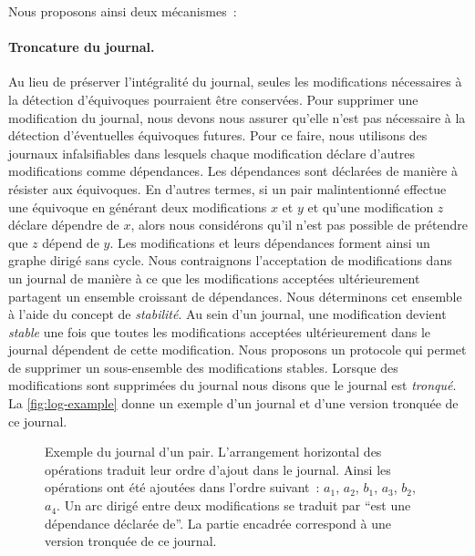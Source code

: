 Nous proposons ainsi deux mécanismes~:

\paragraph{Troncature du journal.} Au lieu de préserver l'intégralité du journal, seules les modifications nécessaires à la détection d'équivoques pourraient être conservées.
Pour supprimer une modification du journal, nous devons nous assurer qu'elle n'est pas nécessaire à la détection d'éventuelles équivoques futures.
Pour ce faire, nous utilisons des journaux infalsifiables dans lesquels chaque modification déclare d'autres modifications comme dépendances.
Les dépendances sont déclarées de manière à résister aux équivoques.
En d'autres termes, si un pair malintentionné effectue une équivoque en générant deux modifications $x$ et $y$ et qu'une modification $z$ déclare dépendre de $x$, alors nous considérons qu'il n'est pas possible de prétendre que $z$ dépend de $y$.
Les modifications et leurs dépendances forment ainsi un graphe dirigé sans cycle.
Nous contraignons l'acceptation de modifications dans un journal de manière à ce que les modifications acceptées ultérieurement partagent un ensemble croissant de dépendances.
Nous déterminons cet ensemble à l'aide du concept de \emph{stabilité}.
Au sein d'un journal, une modification devient \emph{stable} une fois que toutes les modifications acceptées ultérieurement dans le journal dépendent de cette modification.
Nous proposons un protocole qui permet de supprimer un sous-ensemble des modifications stables.
Lorsque des modifications sont supprimées du journal nous disons que le journal est \emph{tronqué}.
La \autoref{fig:log-example} donne un exemple d'un journal et d'une version tronquée de ce journal.

\begin{figure}[hbt]
\centering
{}
\caption[Journal d'un pair]{Exemple du journal d'un pair.
L'arrangement horizontal des opérations traduit leur ordre d'ajout dans le journal.
Ainsi les opérations ont été ajoutées dans l'ordre suivant~: $a_1$, $a_2$, $b_1$, $a_3$, $b_2$, $a_4$.
Un arc dirigé entre deux modifications se traduit par \enquote{est une dépendance déclarée de}.
La partie encadrée correspond à une version tronquée de ce journal.
}\label{fig:log-example}
\end{figure}

